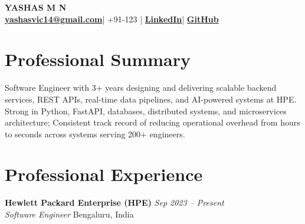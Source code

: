 \documentclass[10pt,a4paper]{article}
\begin{document}
\begin{center}
    {\LARGE \textbf{YASHAS M N}} \\[2pt]
    \small \textbf{\href{mailto:yashasvic14@gmail.com}{yashasvic14@gmail.com}}\;|\; +91-123 \;|\;
    \textbf{\href{https://www.linkedin.com/in/yashas-m-n-5b95a7236}{LinkedIn}}\;|\;
    \textbf{\href{https://github.com/noobie-bob}{GitHub}}
\end{center}

\section*{Professional Summary}
Software Engineer with 3+ years designing and delivering scalable backend services, REST APIs, real-time data pipelines, and AI-powered systems at HPE. Strong in Python, FastAPI, databases, distributed systems, and microservices architecture; Consistent track record of reducing operational overhead from hours to seconds across systems serving 200+ engineers.

\section*{Professional Experience}

\textbf{Hewlett Packard Enterprise (HPE)} \hfill \textit{Sep 2023 -- Present} \\
\textit{Software Engineer} \hfill Bengaluru, India
\end{document}
